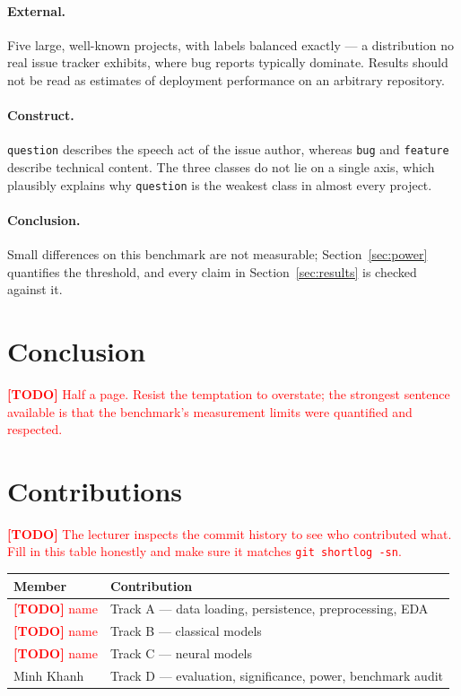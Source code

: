 \documentclass[10pt,a4paper]{article}
\newcommand{\todoitem}[1]{\textcolor{red}{\textbf{[TODO]} #1}}
\begin{document}
\paragraph{External.} Five large, well-known projects, with labels balanced
exactly --- a distribution no real issue tracker exhibits, where bug reports
typically dominate. Results should not be read as estimates of deployment
performance on an arbitrary repository.

\paragraph{Construct.} \texttt{question} describes the speech act of the issue
author, whereas \texttt{bug} and \texttt{feature} describe technical content.
The three classes do not lie on a single axis, which plausibly explains why
\texttt{question} is the weakest class in almost every project.

\paragraph{Conclusion.} Small differences on this benchmark are not
measurable; Section~\ref{sec:power} quantifies the threshold, and every claim
in Section~\ref{sec:results} is checked against it.

\section{Conclusion}
\label{sec:conclusion}

\todoitem{Half a page. Resist the temptation to overstate; the strongest
sentence available is that the benchmark's measurement limits were quantified
and respected.}

\section*{Contributions}

\todoitem{The lecturer inspects the commit history to see who contributed
what. Fill in this table honestly and make sure it matches
\texttt{git shortlog -sn}.}

\begin{table}[h]
\centering
\begin{tabular}{ll}
\toprule
Member & Contribution \\
\midrule
\todoitem{name} & Track A --- data loading, persistence, preprocessing, EDA \\
\todoitem{name} & Track B --- classical models \\
\todoitem{name} & Track C --- neural models \\
Minh Khanh & Track D --- evaluation, significance, power, benchmark audit \\
\bottomrule
\end{tabular}
\end{table}
\end{document}
